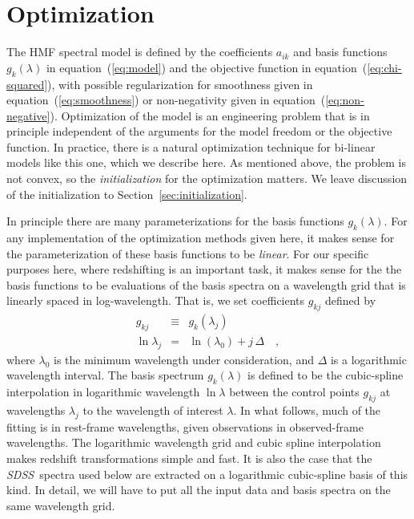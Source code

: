 \documentclass[12pt,preprint]{aastex}
\newcommand{\project}[1]{\textsl{#1}}
\newcommand{\sdss}{\project{SDSS}}
\newcommand{\sectionname}{Section}
\newcommand{\equationname}{equation}
\begin{document}
\section{Optimization}\label{sec:optimization}

The HMF spectral model is defined by the coefficients $a_{ik}$ and basis
functions $g_k(\lambda)$ in \equationname~(\ref{eq:model}) and the
objective function in \equationname~(\ref{eq:chi-squared}), with possible
regularization for smoothness given in
\equationname~(\ref{eq:smoothness}) or non-negativity given in
\equationname~(\ref{eq:non-negative}).  Optimization of the model is an
engineering problem that is in principle independent of the arguments
for the model freedom or the objective function.  In practice, there
is a natural optimization technique for bi-linear models like this
one, which we describe here.  As mentioned above, the problem is not
convex, so the \emph{initialization} for the optimization matters.  We
leave discussion of the initialization to
\sectionname~\ref{sec:initialization}.

In principle there are many parameterizations for the basis functions
$g_k(\lambda)$.  For any implementation of the optimization methods
given here, it makes sense for the parameterization of these basis
functions to be \emph{linear}.  For our specific purposes here, where
redshifting is an important task, it makes sense for the the basis
functions to be evaluations of the basis spectra on a wavelength grid
that is linearly spaced in log-wavelength.  That is, we set
coefficients $g_{kj}$ defined by
\begin{eqnarray}\displaystyle
g_{kj} & \equiv & g_k(\lambda_j) \nonumber\\
\ln\lambda_j & = & \ln(\lambda_0) + j\,\Delta
\quad ,
\end{eqnarray}
where $\lambda_0$ is the minimum wavelength under consideration, and
$\Delta$ is a logarithmic wavelength interval.  The basis spectrum
$g_k(\lambda)$ is defined to be the cubic-spline interpolation in
logarithmic wavelength $\ln\lambda$ between the control points
$g_{kj}$ at wavelengths $\lambda_j$ to the wavelength of interest
$\lambda$.  In what follows, much of the fitting is in rest-frame
wavelengths, given observations in observed-frame wavelengths.  The
logarithmic wavelength grid and cubic spline interpolation makes
redshift transformations simple and fast.  It is also the case that the
\sdss\ spectra used below are extracted on a logarithmic cubic-spline
basis of this kind.  In detail, we will have to put all the input data
and basis spectra on the same wavelength grid.
\end{document}

